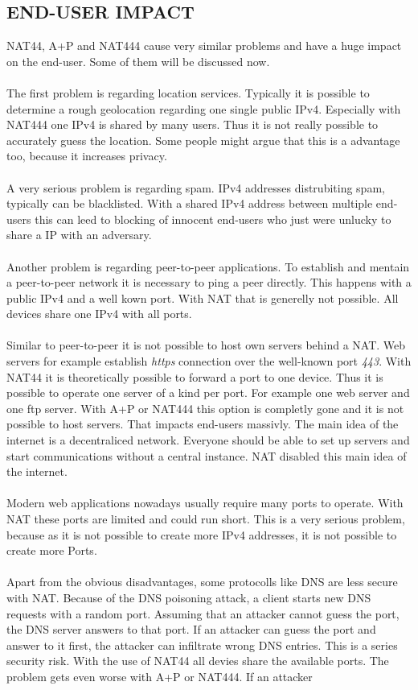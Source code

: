 \documentclass[format=sigconf, natbib=true, nonacm=true]{acmart}
\begin{document}
    \subsection*{END-USER IMPACT}
    NAT44, A+P and NAT444 cause very similar problems and have a huge impact on the end-user. Some of them will be discussed now.\\\\The first problem is regarding location services. Typically it is possible to determine a rough geolocation regarding one single public IPv4. Especially with NAT444 one IPv4 is shared by many users. Thus it is not really possible to accurately guess the location. Some people might argue that this is a advantage too, because it increases privacy\cite{Hughes2022_C04}.\\\\A very serious problem is regarding spam. IPv4 addresses distrubiting spam, typically can be blacklisted. With a shared IPv4 address between multiple end-users this can leed to blocking of innocent end-users who just were unlucky to share a IP with an adversary\cite{Hughes2022_C04}.\\\\Another problem is regarding peer-to-peer applications. To establish and mentain a peer-to-peer network it is necessary to ping a peer directly. This happens with a public IPv4 and a well kown port. With NAT that is generelly not possible. All devices share one IPv4 with all ports\cite{Hughes2022_C04}.\\\\Similar to peer-to-peer it is not possible to host own servers behind a NAT. Web servers for example establish \textit{https} connection over the well-known port \textit{443}. With NAT44 it is theoretically possible to forward a port to one device. Thus it is possible to operate one server of a kind per port. For example one web server and one ftp server. With A+P or NAT444 this option is completly gone and it is not possible to host servers. That impacts end-users massivly. The main idea of the internet is a decentraliced network. Everyone should be able to set up servers and start communications without a central instance. NAT disabled this main idea of the internet\cite{Hughes2022_C04}.\\\\Modern web applications nowadays usually require many ports to operate. With NAT these ports are limited and could run short. This is a very serious problem, because as it is not possible to create more IPv4 addresses, it is not possible to create more Ports\cite{Hughes2022_C04}.\\\\Apart from the obvious disadvantages, some protocolls like DNS are less secure with NAT. Because of the DNS poisoning attack, a client starts new DNS requests with a random port. Assuming that an attacker cannot guess the port, the DNS server answers to that port. If an attacker can guess the port and answer to it first, the attacker can infiltrate wrong DNS entries. This is a series security risk. With the use of NAT44 all devies share the available ports. The problem gets even worse with A+P or NAT444. If an attacker 
\end{document}
